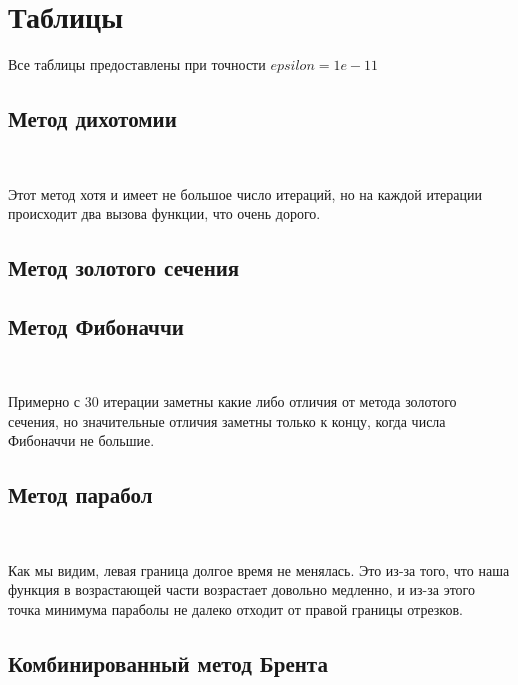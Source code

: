\section {Таблицы}
	Все таблицы предоставлены при точности $epsilon = 1e\!\!-\!\!11$
\subsection {Метод дихотомии}


\ 

Этот метод хотя и имеет не большое число итераций,
но на каждой итерации происходит два вызова функции, что очень дорого.

\subsection {Метод золотого сечения}


\subsection {Метод Фибоначчи}


\ 

Примерно с 30 итерации заметны какие либо отличия от метода золотого сечения, 
но значительные отличия заметны только к концу, когда числа 
Фибоначчи не большие.

\subsection {Метод парабол}


\ 

Как мы видим, левая граница долгое время не менялась.
Это из-за того, что наша функция в возрастающей части
возрастает довольно медленно, и из-за этого точка минимума параболы
не далеко отходит от правой границы отрезков.

\subsection {Комбинированный метод Брента}

